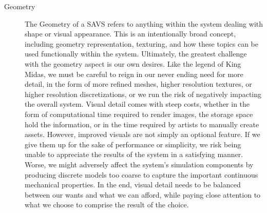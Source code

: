 \begin{description}
\item[Geometry] The Geometry of a SAVS refers to anything within the
  system dealing with shape or visual appearance. This is an
  intentionally broad concept, including geometry representation,
  texturing, and how these topics can be used functionally within the
  system. Ultimately, the greatest challenge with the geometry aspect
  is our own desires. Like the legend of King Midas, we must be
  careful to reign in our never ending need for more detail, in the
  form of more refined meshes, higher resolution textures, or higher
  resolution discretizations, or we run the risk of negatively
  impacting the overall system. Visual detail comes with steep costs,
  whether in the form of computational time required to render images,
  the storage space hold the information, or in the time required by
  artists to manually create assets. However, improved visuals are not
  simply an optional feature. If we give them up for the sake of
  performance or simplicity, we risk being unable to appreciate the
  results of the system in a satisfying manner. Worse, we might
  adversely affect the system's simulation components by producing
  discrete models too coarse to capture the important continuous
  mechanical properties. In the end, visual detail needs to be
  balanced between our wants and what we can afford, while paying
  close attention to what we choose to comprise the result of the
  choice.


\end{description}
